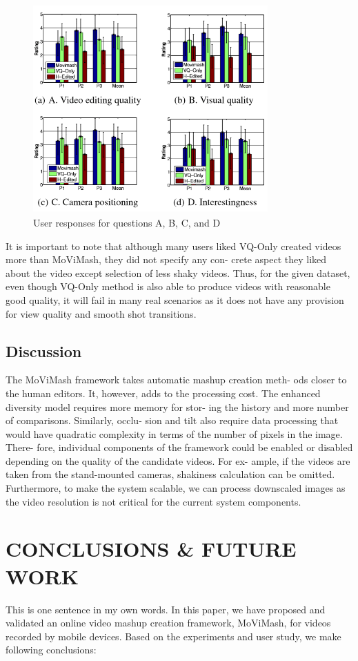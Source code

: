 \documentclass{clsfile}
\begin{document}
\begin{figure}
\includegraphics[width=9cm, height=8cm]{fig7.png}
   \caption{ User responses for questions A, B, C, and D}

\end{figure}

It is important to note that although many users liked VQ-Only
created videos more than MoViMash, they did not specify any con-
crete aspect they liked about the video except selection of less
shaky videos. Thus, for the given dataset, even though VQ-Only
method is also able to produce videos with reasonable good quality,
it will fail in many real scenarios as it does not have any provision
for view quality and smooth shot transitions.

\subsection{Discussion}
The MoViMash framework takes automatic mashup creation meth-
ods closer to the human editors. It, however, adds to the processing
cost. The enhanced diversity model requires more memory for stor-
ing the history and more number of comparisons. Similarly, occlu-
sion and tilt also require data processing that would have quadratic
complexity in terms of the number of pixels in the image. There-
fore, individual components of the framework could be enabled or
disabled depending on the quality of the candidate videos. For ex-
ample, if the videos are taken from the stand-mounted cameras,
shakiness calculation can be omitted. Furthermore, to make the
system scalable, we can process downscaled images as the video
resolution is not critical for the current system components.

\section{CONCLUSIONS \& FUTURE WORK}
This is one sentence in my own words.
In this paper, we have proposed and validated an online video
mashup creation framework, MoViMash, for videos recorded by
mobile devices. Based on the experiments and user study, we make
following conclusions:
\end{document}
